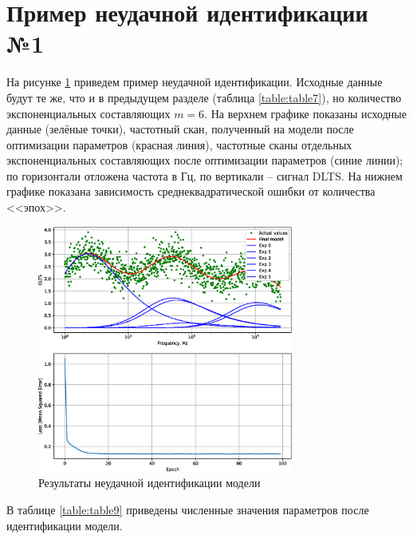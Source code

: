 \documentclass{report}
\begin{document}
        \section{Пример неудачной идентификации №1}
        На рисунке \ref{pic:pic7} приведем пример неудачной идентификации. Исходные 
        данные будут те же, что и в предыдущем разделе (таблица \ref{table:table7}), 
        но количество экспоненциальных составляющих $m = 6$. На верхнем графике 
        показаны исходные данные (зелёные точки), частотный скан, полученный на модели 
        после оптимизации параметров (красная линия), частотные сканы отдельных 
        экспоненциальных составляющих после оптимизации параметров (синие линии); 
        по горизонтали отложена частота в Гц, по вертикали -- сигнал DLTS. 
        На нижнем графике показана зависимость среднеквадратической ошибки от 
        количества <<эпох>>.
        \begin{figure}[ht]
            \centering
            \includegraphics[width=0.75\textwidth]{unsuccessful_identification}
            \caption{Результаты неудачной идентификации модели}
            \label{pic:pic7}
        \end{figure}

        В таблице \ref{table:table9} приведены численные значения параметров после 
        идентификации модели.
\end{document}

